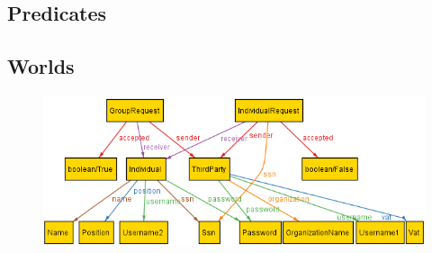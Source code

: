\documentclass[a4paper]{article}
\begin{document}
    
    
    
    
\subsection{Predicates}

    
    
    
    
    
    
    
    
\newpage
\subsection{Worlds}
    
    \begin{figure}[!ht]
    	\centering
    	\includegraphics[width=\textwidth]{RASD/images/alloy/data4Help.png}
    \end{figure}
    
\end{document}
